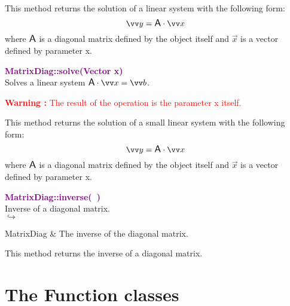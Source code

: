 This method returns the solution of a linear system with the following form:
\begin{equation*}
\overrightarrow{y} = \A \cdot \overrightarrow{x}
\end{equation*}
where $\mbox{\large\ensuremath{\mathsf{A}}}$ is a diagonal matrix defined by the object itself and $\overrightarrow{x}$ is a vector defined by parameter x.

\textcolor{purple}{\textbf{MatrixDiag::solve(Vector x)}}\label{MatrixDiag::solve(Vector x)}\\
Solves a linear system $\A\cdot \overrightarrow{x} = \overrightarrow{b}$.

\hspace*{10mm}\textcolor{red}{\textbf{Warning :}  The result of the operation is the parameter x itself.}

This method returns the solution of a small linear system with the following form:
\begin{equation*}
\overrightarrow{y} = \A \cdot \overrightarrow{x}
\end{equation*}
where $\mbox{\large\ensuremath{\mathsf{A}}}$ is a diagonal matrix defined by the object itself and $\overrightarrow{x}$ is a vector defined by parameter x.

\textcolor{purple}{\textbf{MatrixDiag::inverse(~)}}\label{MatrixDiag::inverse()}\\
Inverse of a diagonal matrix.\\ \hspace*{5mm}$\hookrightarrow$
\vspace*{-2em}\begin{tcolorbox}[grow to left by=-1cm, width=\textwidth-1cm,myArgs,tabularx={l|R}]
MatrixDiag & The inverse of the diagonal matrix.
\end{tcolorbox}

This method returns the inverse of a diagonal matrix.

\section{The Function classes}

